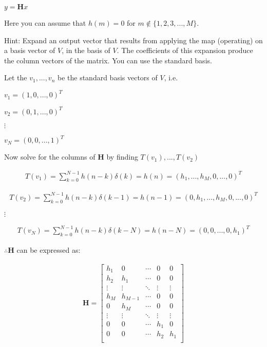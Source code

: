 \documentclass[fleqn]{article}
\begin{document}
\begin{enumerate}[nolistsep]
\begin{enumerate}
			\begin{center}
				$y = \mathbf{H}x$
			\end{center}
			
			Here you can assume that $h(m) = 0$ for $m \not\in \{1,2,3,...,M\}$.
			
			Hint: Expand an output vector that results from applying the map (operating) on a basis vector of $V$, in the basis of $V$. The coefficients of this expansion produce the column vectors of the matrix. You can use the standard basis.

			Let the $v_1,...,v_n$ be the standard basis vectors of $V$, i.e.
			
			$v_1 = (1, 0,...,0)^T$
			
			$v_2 = (0, 1,...,0)^T$
			
			$\vdots$
			
			$v_N = (0, 0,...,1)^T$
			
			Now solve for the columns of $\mathbf{H}$ by finding $T(v_1),...,T(v_2)$
			
			\begin{align*}
				T(v_1) = \sum_{k=0}^{N-1}{h(n-k)\delta(k)} = h(n) = (h_1,...,h_M,0,...,0)^T
			\end{align*}
			
			\begin{align*}
				T(v_2) = \sum_{k=0}^{N-1}{h(n-k)\delta(k-1)} = h(n-1) = (0, h_1,...,h_M,0,...,0)^T
			\end{align*}
			
			$\vdots$
			
			\begin{align*}
				T(v_N) = \sum_{k=0}^{N-1}{h(n-k)\delta(k-N)} = h(n-N) = (0, 0,...,0,h_1)^T
			\end{align*}
			
			\newpage
			$\therefore \mathbf{H}$ can be expressed as:
			
			\begin{align*}
				\mathbf{H} =
				\begin{bmatrix}
					h_1 		& 0 			& \cdots 	& 0 			& 0\\
					h_2 		& h_1 		& \cdots 	& 0 			& 0\\
					\vdots 	& \vdots 	& \ddots 	& \vdots 	& \vdots\\
					h_M 		& h_{M-1} 	& \cdots 	& 0 			& 0\\
					0 		& h_M		& \cdots 	& 0 			& 0\\
					\vdots 	& \vdots 	& \ddots 	& \vdots 	& \vdots\\
					0		& 0			& \cdots 	& h_1		& 0\\       
					0 		& 0			& \cdots 	& h_2		& h_1\\
				\end{bmatrix}
			\end{align*}
			

\end{enumerate}
\end{enumerate}
\end{document}
